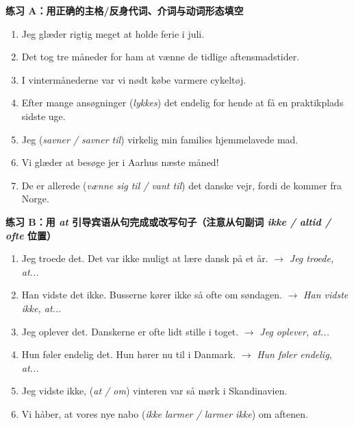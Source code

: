 \textbf{练习 A：用正确的主格/反身代词、介词与动词形态填空}
\begin{enumerate}
  \item Jeg glæder \underline{\hspace{1.2cm}} rigtig meget \underline{\hspace{1.0cm}} at holde ferie i juli.
  \item Det tog tre måneder for ham at vænne \underline{\hspace{1.2cm}} \underline{\hspace{1.0cm}} de tidlige aftensmadstider.
  \item I vintermånederne var vi nødt \underline{\hspace{1.6cm}} købe varmere cykeltøj.
  \item Efter mange ansøgninger \underline{\hspace{2.2cm}} (\textit{lykkes}) det endelig for hende at få en praktikplads sidste uge.
  \item Jeg \underline{\hspace{1.8cm}} (\textit{savner / savner til}) virkelig min families hjemmelavede mad.
  \item Vi glæder \underline{\hspace{1.2cm}} \underline{\hspace{1.0cm}} at besøge jer i Aarhus næste måned!
  \item De er allerede \underline{\hspace{2.4cm}} (\textit{vænne sig til / vant til}) det danske vejr, fordi de kommer fra Norge.
\end{enumerate}

\textbf{练习 B：用 \textit{at} 引导宾语从句完成或改写句子（注意从句副词 \textit{ikke / altid / ofte} 位置）}
\begin{enumerate}
  \item Jeg troede det. Det var ikke muligt at lære dansk på et år. $\rightarrow$ \textit{Jeg troede, at...}
  \item Han vidste det ikke. Busserne kører ikke så ofte om søndagen. $\rightarrow$ \textit{Han vidste ikke, at...}
  \item Jeg oplever det. Danskerne er ofte lidt stille i toget. $\rightarrow$ \textit{Jeg oplever, at...}
  \item Hun føler endelig det. Hun hører nu til i Danmark. $\rightarrow$ \textit{Hun føler endelig, at...}
  \item Jeg vidste ikke, \underline{\hspace{1.4cm}} (\textit{at / om}) vinteren var så mørk i Skandinavien.
  \item Vi håber, at vores nye nabo \underline{\hspace{2.6cm}} (\textit{ikke larmer / larmer ikke}) om aftenen.
\end{enumerate}

